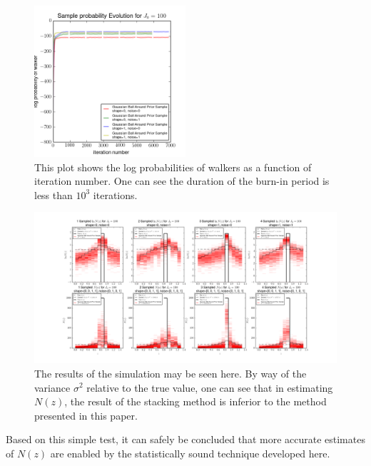 \documentclass[preprint]{aastex}
\begin{document}
\begin{figure}
\includegraphics[width=0.5\textwidth]{probs-toy.png}
\caption{This plot shows the log probabilities of walkers as a function of iteration number.  One can see the duration of the burn-in period is less than $10^{3}$ iterations.}
\label{fig:dumbestprob}
\end{figure}

\begin{figure}
\includegraphics[width=\textwidth]{samps-toy.png}
\caption{The results of the simulation may be seen here.  By way of the variance $\sigma^{2}$ relative to the true value, one can see that in estimating $N(z)$, the result of the stacking method is inferior to the method presented in this paper.}
\label{fig:dumbestparam}
\end{figure}

Based on this simple test, it can safely be concluded that more accurate estimates of $N(z)$ are enabled by the statistically sound technique developed here.

\end{document}

